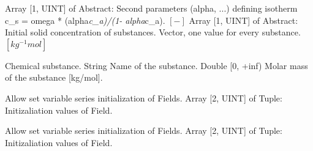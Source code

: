 \begin{RecordType}
		\KeyItem
			{}
			{{Array [1, UINT] of }{Abstract}{: }}
			{\textrangle}
			{} %
			{{{Second parameters (alpha, ...) defining isotherm  c{\_}s = omega * (alpha}\textit{c{\_}a)/(1- alpha}{c{\_}a). }{$[-]$}}}
		\KeyItem
			{}
			{{Array [1, UINT] of }{Abstract}{: }}
			{\textrangle}
			{} %
			{{{Initial solid concentration of substances. Vector, one value for every substance. }{$[kg^{-1}mol]$}}}
\end{RecordType}
\begin{RecordType}
	{}
	{} %
	{} %
	{} %
	{{{Chemical substance.}}}
		\KeyItem
			{}
			{{String}}
			{\textrangle}
			{} %
			{{{Name of the substance.}}}
		\KeyItem
			{}
			{{Double [0, +inf)}}
			{\textrangle}
			{} %
			{{{Molar mass of the substance [kg/mol].}}}
\end{RecordType}
\begin{RecordType}
	{}
	{} %
	{} %
	{} %
	{{{Allow set variable series initialization of Fields.}}}
		\KeyItem
			{}
			{{Array [2, UINT] of }{Tuple}{: }}
			{\textrangle}
			{} %
			{{{Initizaliation values of Field.}}}
\end{RecordType}
\begin{RecordType}
	{}
	{} %
	{} %
	{} %
	{{{Allow set variable series initialization of Fields.}}}
		\KeyItem
			{}
			{{Array [2, UINT] of }{Tuple}{: }}
			{\textrangle}
			{} %
			{{{Initizaliation values of Field.}}}
\end{RecordType}
